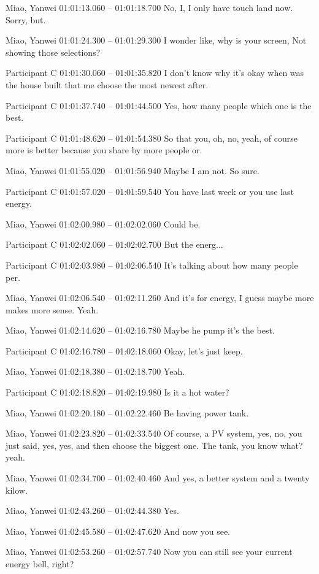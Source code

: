 {Miao, Yanwei 01:01:13.060 -- 01:01:18.700
No, I, I only have touch land now. Sorry, but.

Miao, Yanwei 01:01:24.300 -- 01:01:29.300
I wonder like, why is your screen, Not showing those selections?

Participant C 01:01:30.060 -- 01:01:35.820
I don't know why it's okay when was the house built that me choose the most newest after.

Participant C 01:01:37.740 -- 01:01:44.500
Yes, how many people which one is the best.

Participant C 01:01:48.620 -- 01:01:54.380
So that you, oh, no, yeah, of course more is better because you share by more people or.

Miao, Yanwei 01:01:55.020 -- 01:01:56.940
Maybe I am not. So sure.

Participant C 01:01:57.020 -- 01:01:59.540
You have last week or you use last energy.

Miao, Yanwei 01:02:00.980 -- 01:02:02.060
Could be.

Participant C 01:02:02.060 -- 01:02:02.700
But the energ...

Participant C 01:02:03.980 -- 01:02:06.540
It's talking about how many people per.

Miao, Yanwei 01:02:06.540 -- 01:02:11.260
And it's for energy, I guess maybe more makes more sense. Yeah.

Miao, Yanwei 01:02:14.620 -- 01:02:16.780
Maybe he pump it's the best.

Participant C 01:02:16.780 -- 01:02:18.060
Okay, let's just keep.

Miao, Yanwei 01:02:18.380 -- 01:02:18.700
Yeah.

Participant C 01:02:18.820 -- 01:02:19.980
Is it a hot water?

Miao, Yanwei 01:02:20.180 -- 01:02:22.460
Be having power tank.

Miao, Yanwei 01:02:23.820 -- 01:02:33.540
Of course, a PV system, yes, no, you just said, yes, yes, and then choose the biggest one. The tank, you know what? yeah.

Miao, Yanwei 01:02:34.700 -- 01:02:40.460
And yes, a better system and a twenty kilow.

Miao, Yanwei 01:02:43.260 -- 01:02:44.380
Yes.

Miao, Yanwei 01:02:45.580 -- 01:02:47.620
And now you see.

Miao, Yanwei 01:02:53.260 -- 01:02:57.740
Now you can still see your current energy bell, right?

}
